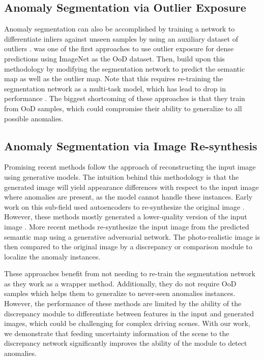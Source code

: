 \documentclass[final]{cvpr}
\begin{document}
\subsection{Anomaly Segmentation via Outlier Exposure}
Anomaly segmentation can also be accomplished by training a network to differentiate inliers against unseen samples by using an auxiliary dataset of outliers \cite{outlier_exposure}. \cite{outlier_train} was one of the first approaches to use outlier exposure for dense predictions using ImageNet \cite{imagenet} as the OoD dataset. Then, \cite{anomaly_score} build upon this methodology by modifying the segmentation network to predict the semantic map as well as the outlier map. Note that this requires re-training the segmentation network as a multi-task model, which has lead to drop in performance \cite{multitask}. 
The biggest shortcoming of these approaches is that they train from OoD samples, which could compromise their ability to generalize to all possible anomalies. 

\subsection{Anomaly Segmentation via Image Re-synthesis}
Promising recent methods follow the approach of reconstructing the input image using generative models. The intuition behind this methodology is that the generated image will yield appearance differences with respect to the input image where anomalies are present, as the model cannot handle these instances. Early work on this sub-field used autoencoders to re-synthesize the original image \cite{ae_1, ae_2}. However, these methods mostly generated a lower-quality version of the input image \cite{epfl}. 
More recent methods \cite{synthesize_compare, master_thesis_old, epfl} re-synthesize the input image from the predicted semantic map using a generative adversarial network. The photo-realistic image is then compared to the original image by a discrepancy or comparison module to localize the anomaly instances. 

These approaches benefit from not needing to re-train the segmentation network as they work as a wrapper method. Additionally, they do not require OoD samples which helps them to generalize to never-seen anomalies instances. 
However, the performance of these methods are limited by the ability of the discrepancy module to differentiate between features in the input and generated images, which could be challenging for complex driving scenes. 
With our work, we demonstrate that feeding uncertainty information of the scene to the discrepancy network significantly improves the ability of the module to detect anomalies. 
\end{document}

